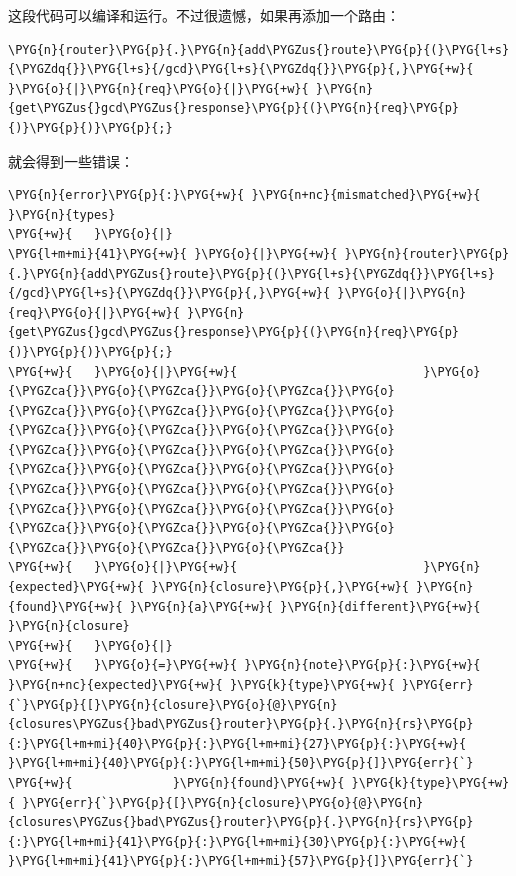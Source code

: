 这段代码可以编译和运行。不过很遗憾，如果再添加一个路由：

\begin{Verbatim}[commandchars=\\\{\},breaklines=true,breakanywhere=true,fontsize=\codefont,xleftmargin=17bp]
\PYG{n}{router}\PYG{p}{.}\PYG{n}{add\PYGZus{}route}\PYG{p}{(}\PYG{l+s}{\PYGZdq{}}\PYG{l+s}{/gcd}\PYG{l+s}{\PYGZdq{}}\PYG{p}{,}\PYG{+w}{ }\PYG{o}{|}\PYG{n}{req}\PYG{o}{|}\PYG{+w}{ }\PYG{n}{get\PYGZus{}gcd\PYGZus{}response}\PYG{p}{(}\PYG{n}{req}\PYG{p}{)}\PYG{p}{)}\PYG{p}{;}
\end{Verbatim}

就会得到一些错误：

\begin{Verbatim}[commandchars=\\\{\},breaklines=true,breakanywhere=true,fontsize=\codefont,xleftmargin=17bp]
\PYG{n}{error}\PYG{p}{:}\PYG{+w}{ }\PYG{n+nc}{mismatched}\PYG{+w}{ }\PYG{n}{types}
\PYG{+w}{   }\PYG{o}{|}
\PYG{l+m+mi}{41}\PYG{+w}{ }\PYG{o}{|}\PYG{+w}{ }\PYG{n}{router}\PYG{p}{.}\PYG{n}{add\PYGZus{}route}\PYG{p}{(}\PYG{l+s}{\PYGZdq{}}\PYG{l+s}{/gcd}\PYG{l+s}{\PYGZdq{}}\PYG{p}{,}\PYG{+w}{ }\PYG{o}{|}\PYG{n}{req}\PYG{o}{|}\PYG{+w}{ }\PYG{n}{get\PYGZus{}gcd\PYGZus{}response}\PYG{p}{(}\PYG{n}{req}\PYG{p}{)}\PYG{p}{)}\PYG{p}{;}
\PYG{+w}{   }\PYG{o}{|}\PYG{+w}{                          }\PYG{o}{\PYGZca{}}\PYG{o}{\PYGZca{}}\PYG{o}{\PYGZca{}}\PYG{o}{\PYGZca{}}\PYG{o}{\PYGZca{}}\PYG{o}{\PYGZca{}}\PYG{o}{\PYGZca{}}\PYG{o}{\PYGZca{}}\PYG{o}{\PYGZca{}}\PYG{o}{\PYGZca{}}\PYG{o}{\PYGZca{}}\PYG{o}{\PYGZca{}}\PYG{o}{\PYGZca{}}\PYG{o}{\PYGZca{}}\PYG{o}{\PYGZca{}}\PYG{o}{\PYGZca{}}\PYG{o}{\PYGZca{}}\PYG{o}{\PYGZca{}}\PYG{o}{\PYGZca{}}\PYG{o}{\PYGZca{}}\PYG{o}{\PYGZca{}}\PYG{o}{\PYGZca{}}\PYG{o}{\PYGZca{}}\PYG{o}{\PYGZca{}}\PYG{o}{\PYGZca{}}\PYG{o}{\PYGZca{}}\PYG{o}{\PYGZca{}}
\PYG{+w}{   }\PYG{o}{|}\PYG{+w}{                          }\PYG{n}{expected}\PYG{+w}{ }\PYG{n}{closure}\PYG{p}{,}\PYG{+w}{ }\PYG{n}{found}\PYG{+w}{ }\PYG{n}{a}\PYG{+w}{ }\PYG{n}{different}\PYG{+w}{ }\PYG{n}{closure}
\PYG{+w}{   }\PYG{o}{|}
\PYG{+w}{   }\PYG{o}{=}\PYG{+w}{ }\PYG{n}{note}\PYG{p}{:}\PYG{+w}{ }\PYG{n+nc}{expected}\PYG{+w}{ }\PYG{k}{type}\PYG{+w}{ }\PYG{err}{`}\PYG{p}{[}\PYG{n}{closure}\PYG{o}{@}\PYG{n}{closures\PYGZus{}bad\PYGZus{}router}\PYG{p}{.}\PYG{n}{rs}\PYG{p}{:}\PYG{l+m+mi}{40}\PYG{p}{:}\PYG{l+m+mi}{27}\PYG{p}{:}\PYG{+w}{ }\PYG{l+m+mi}{40}\PYG{p}{:}\PYG{l+m+mi}{50}\PYG{p}{]}\PYG{err}{`}
\PYG{+w}{              }\PYG{n}{found}\PYG{+w}{ }\PYG{k}{type}\PYG{+w}{ }\PYG{err}{`}\PYG{p}{[}\PYG{n}{closure}\PYG{o}{@}\PYG{n}{closures\PYGZus{}bad\PYGZus{}router}\PYG{p}{.}\PYG{n}{rs}\PYG{p}{:}\PYG{l+m+mi}{41}\PYG{p}{:}\PYG{l+m+mi}{30}\PYG{p}{:}\PYG{+w}{ }\PYG{l+m+mi}{41}\PYG{p}{:}\PYG{l+m+mi}{57}\PYG{p}{]}\PYG{err}{`}

\end{Verbatim}
